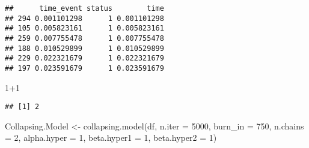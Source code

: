 \documentclass[
]{article}
\newenvironment{Shaded}{\begin{snugshade}}{\end{snugshade}}
\newcommand{\AttributeTok}[1]{\textcolor[rgb]{0.77,0.63,0.00}{#1}}
\newcommand{\DecValTok}[1]{\textcolor[rgb]{0.00,0.00,0.81}{#1}}
\newcommand{\FunctionTok}[1]{\textcolor[rgb]{0.00,0.00,0.00}{#1}}
\newcommand{\NormalTok}[1]{#1}
\newcommand{\OtherTok}[1]{\textcolor[rgb]{0.56,0.35,0.01}{#1}}
\newcommand{\SpecialCharTok}[1]{\textcolor[rgb]{0.00,0.00,0.00}{#1}}
\begin{document}
\begin{verbatim}
##      time_event status        time
## 294 0.001101298      1 0.001101298
## 105 0.005823161      1 0.005823161
## 259 0.007755478      1 0.007755478
## 188 0.010529899      1 0.010529899
## 229 0.022321679      1 0.022321679
## 197 0.023591679      1 0.023591679
\end{verbatim}

\begin{Shaded}
\begin{Highlighting}[]
\DecValTok{1}\SpecialCharTok{+}\DecValTok{1}
\end{Highlighting}
\end{Shaded}

\begin{verbatim}
## [1] 2
\end{verbatim}

\begin{Shaded}
\begin{Highlighting}[]

\NormalTok{Collapsing.Model }\OtherTok{\textless{}{-}} \FunctionTok{collapsing.model}\NormalTok{(df,}
                                     \AttributeTok{n.iter =} \DecValTok{5000}\NormalTok{,}
                                     \AttributeTok{burn\_in =} \DecValTok{750}\NormalTok{,}
                                     \AttributeTok{n.chains =} \DecValTok{2}\NormalTok{,}
                                     \AttributeTok{alpha.hyper =} \DecValTok{1}\NormalTok{,}
                                     \AttributeTok{beta.hyper1 =} \DecValTok{1}\NormalTok{,}
                                     \AttributeTok{beta.hyper2 =} \DecValTok{1}\NormalTok{)}

\end{Highlighting}
\end{Shaded}
\end{document}
